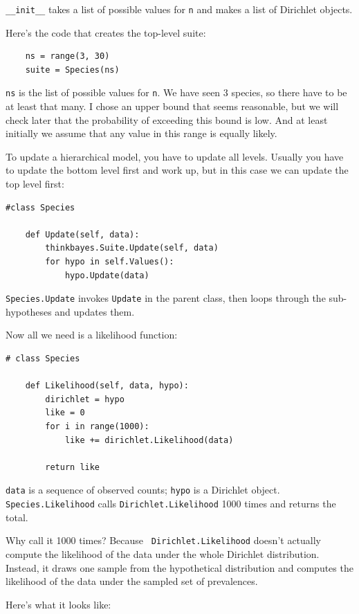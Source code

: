 \documentclass[12pt]{book}
\begin{document}
\verb"__init__" takes a list of possible values for {\tt n} and
makes a list of Dirichlet objects.

Here's the code that creates the top-level suite:

\begin{verbatim}
    ns = range(3, 30)
    suite = Species(ns)
\end{verbatim}

{\tt ns} is the list of possible values for {\tt n}.  We have seen 3
species, so there have to be at least that many.  I chose an upper
bound that seems reasonable, but we will check later that the
probability of exceeding this bound is low.  And at least initially
we assume that any value in this range is equally likely.

To update a hierarchical model, you have to update all levels.
Usually you have to update the bottom
level first and work up, but in this case we can
update the top level first:

\begin{verbatim}
#class Species

    def Update(self, data):
        thinkbayes.Suite.Update(self, data)
        for hypo in self.Values():
            hypo.Update(data)
\end{verbatim}

{\tt Species.Update} invokes {\tt Update} in the parent class,
then loops through the sub-hypotheses and updates them.

Now all we need is a likelihood function:

\begin{verbatim}
# class Species

    def Likelihood(self, data, hypo):
        dirichlet = hypo
        like = 0
        for i in range(1000):
            like += dirichlet.Likelihood(data)

        return like
\end{verbatim}

{\tt data} is a sequence of
observed counts; {\tt hypo} is a Dirichlet object.
{\tt Species.Likelihood} calls
{\tt Dirichlet.Likelihood} 1000 times and returns the total.

Why call it 1000 times?  Because {\tt
  Dirichlet.Likelihood} doesn't actually compute the likelihood of the
data under the whole Dirichlet distribution.  Instead, it draws one
sample from the hypothetical distribution and computes the likelihood
of the data under the sampled set of prevalences.

Here's what it looks like:
\end{document}
